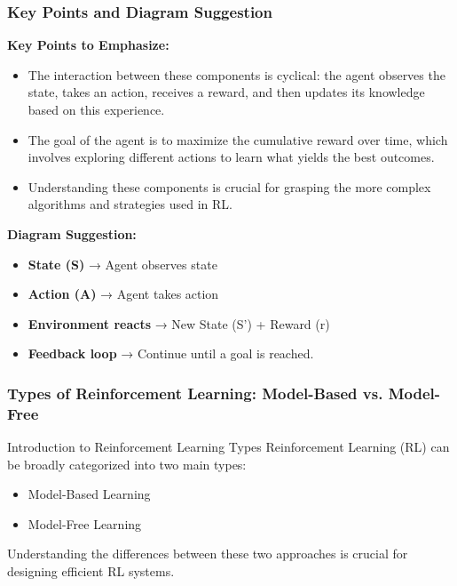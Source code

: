\documentclass[aspectratio=169]{beamer}
\begin{document}
\begin{frame}[fragile]
    \frametitle{Key Points and Diagram Suggestion}
    \textbf{Key Points to Emphasize:}
    \begin{itemize}
        \item The interaction between these components is cyclical: the agent observes the state, takes an action, receives a reward, and then updates its knowledge based on this experience.
        \item The goal of the agent is to maximize the cumulative reward over time, which involves exploring different actions to learn what yields the best outcomes.
        \item Understanding these components is crucial for grasping the more complex algorithms and strategies used in RL.
    \end{itemize}
    
    \textbf{Diagram Suggestion:}
    \begin{itemize}
        \item \textbf{State (S)} → Agent observes state
        \item \textbf{Action (A)} → Agent takes action
        \item \textbf{Environment reacts} → New State (S') + Reward (r)
        \item \textbf{Feedback loop} → Continue until a goal is reached.
    \end{itemize}
\end{frame}

\begin{frame}[fragile]
    \frametitle{Types of Reinforcement Learning: Model-Based vs. Model-Free}
    
    \begin{block}{Introduction to Reinforcement Learning Types}
        Reinforcement Learning (RL) can be broadly categorized into two main types: 
        \begin{itemize}
            \item Model-Based Learning
            \item Model-Free Learning
        \end{itemize}
        Understanding the differences between these two approaches is crucial for designing efficient RL systems.
    \end{block}
\end{frame}
\end{document}
